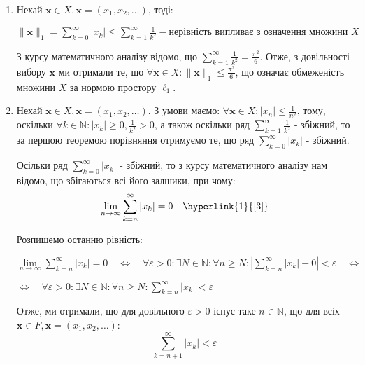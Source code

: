 \documentclass[a5paper, 20pt, titlepage]{article}
\newcommand{\x}{\textbf{x}}
\begin{document}
\begin{enumerate}
\item Нехай $\x \in X, \x = (x_1, x_2, \dots)$, тоді:

$\| \x \|_1 = \sum \limits_{k = 0}^{\infty} |x_k| \leqslant \sum \limits_{k = 1}^{\infty} \frac{1}{k^2} - \text{нерівність випливає з означення множини $X$}$ 

З курсу математичного аналізу відомо, що $\sum \limits_{k = 1}^{\infty} \frac{1}{k^2} = \frac{\pi^2}{6}$. Отже, з довільності вибору $\x$ ми отримали те, що $\forall \x \in X: \| \x \|_1 \leqslant \frac{\pi^2}{6}$, що означає обмеженість множини $X$ за нормою простору $\ell_1$.

\vspace{3mm}
\item Нехай $\x \in X, \x = (x_1, x_2, \dots)$. З умови маємо: $\forall \x \in X: |x_n| \leqslant \frac{1}{n^2}$, тому, оскільки \newline $\forall k \in \mathbb{N}: |x_k| \geqslant 0, \frac{1}{k^2} > 0$, а також оскільки ряд $\sum \limits_{k = 1}^{\infty} \frac{1}{k^2}$ - збіжний, то за першою теоремою порівняння отримуємо те, що ряд  $\sum \limits_{k = 0}^{\infty} |x_k|$ - збіжний.

\vspace{3mm}
Осільки ряд $\sum \limits_{k = 0}^{\infty} |x_k|$ - збіжний, то з курсу математичного аналізу нам відомо, що збігаються всі його залшики, при чому:
$$ \lim \limits_{n \to \infty} \sum \limits_{k = n}^{\infty} |x_k| = 0 \quad \hyperlink{1}{[3]}$$

Розпишемо останню рівність:

\vspace{3mm}
$ \lim \limits_{n \to \infty} \sum \limits_{k = n}^{\infty} |x_k| = 0 \quad \Leftrightarrow \quad \forall \varepsilon > 0: \exists N \in \mathbb{N}: \forall n \geqslant N: \left| \sum \limits_{k = n}^{\infty} |x_k| - 0 \right| < \varepsilon \quad \Leftrightarrow$

\vspace{3mm}
\hspace{29mm}
$\Leftrightarrow \quad \forall \varepsilon > 0: \exists N \in \mathbb{N}: \forall n \geqslant N: \sum \limits_{k = n}^{\infty} |x_k| < \varepsilon \quad$

\vspace{3mm}
Отже, ми отримали, що для довільного $\varepsilon > 0$ існує таке $n \in \mathbb{N}$, що для всіх $\x \in F, \x = (x_1, x_2, \dots)$: 
$$ \sum \limits_{k = n + 1}^{\infty}|x_k| < \varepsilon$$
\end{enumerate}
\end{document}

